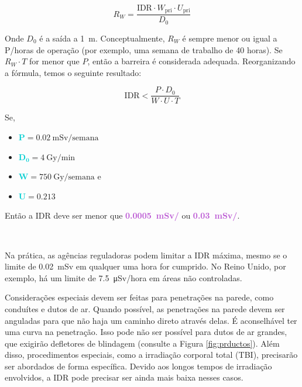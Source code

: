 \documentclass[11pt,a4paper]{article}
\newcounter{exemplo}
\begin{document}
	\begin{equation}
	R_W = \frac{\text{IDR} \cdot W_\text{pri} \cdot U_\text{pri}}{D_0}
	\end{equation}

	Onde $D_0$ é a saída a \SI{1}{\meter}. Conceptualmente, $R_W$ é sempre menor ou igual a P/horas de operação (por exemplo, uma semana de trabalho de 40 horas). Se $R_W \cdot T$ for menor que $P$, então a barreira é considerada adequada. Reorganizando a fórmula, temos o seguinte resultado:

	\begin{equation}
	\text{IDR} <  \frac{P \cdot D_0}{W \cdot U \cdot T} 
	\end{equation}

	\begin{tcolorbox}[width=\textwidth, colback={white}, colbacktitle={DarkTurquoise!50!white}, title={$\bigstar$ \LobsterTwo{Exemplo: IDR} $\bigstar $}, coltitle={CarnationPink}, colframe={DarkTurquoise}, fonttitle=\rmfamily\bfseries\Large, breakable]
		Se,
		\begin{itemize}
			\item \textcolor{DarkTurquoise}{$\mathbf{P}$}$= \SI{0.02}{\milli\sievert}/\text{semana}$
			\item \textcolor{DarkTurquoise}{$\mathbf{D_0}$}$= \SI{4}{\gray}/\text{min}$
			\item \textcolor{DarkTurquoise}{$\mathbf{W}$}$= \SI{750}{\gray}/\text{semana}$ e
			\item \textcolor{DarkTurquoise}{$\mathbf{U}$}$= 0.213$
		\end{itemize}

		 Então a IDR deve ser menor que \textcolor{MediumOrchid}{\textbf{\SI{0.0005}{\milli\sievert}/}} ou \textcolor{MediumOrchid}{\textbf{\SI{0.03}{\milli\sievert}/}}.
		 
		 \

		 Na prática, as agências reguladoras podem limitar a IDR máxima, mesmo se o limite de \SI{0.02}{\milli\sievert} em qualquer uma hora for cumprido. No Reino Unido, por exemplo, há um limite de \SI{7.5}{\micro\sievert}/hora em áreas não controladas.
	\end{tcolorbox}

	Considerações especiais devem ser feitas para penetrações na parede, como conduítes e dutos de ar. Quando possível, as penetrações na parede devem ser anguladas para que não haja um caminho direto através delas. É aconselhável ter uma curva na penetração. Isso pode não ser possível para dutos de ar grandes, que exigirão defletores de blindagem (consulte a Figura \ref{fig:prductos}). Além disso, procedimentos especiais, como a irradiação corporal total (TBI), precisarão ser abordados de forma específica. Devido aos longos tempos de irradiação envolvidos, a IDR pode precisar ser ainda mais baixa nesses casos.
\end{document}
